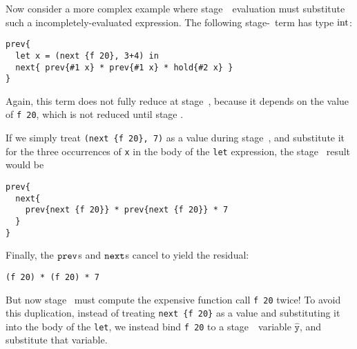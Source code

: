 Now consider a more complex example where stage~\bbone\ evaluation must
substitute such a incompletely-evaluated expression. The following
stage-\bbtwo\ term has type ${\rm int}$:
\begin{lstlisting} 
prev{
  let x = (next {f 20}, 3+4) in
  next{ prev{#1 x} * prev{#1 x} * hold{#2 x} }
}
\end{lstlisting}
Again, this term does not fully reduce at stage~\bbone, because it depends on
the value of \verb|f 20|, which is not reduced until stage \bbtwo.

If we simply treat \verb|(next {f 20}, 7)| as a value during stage~\bbone, and
substitute it for the three occurrences of \verb|x| in the body of the
\verb|let| expression, the stage \bbone\ result would be
\begin{lstlisting} 
prev{
  next{ 
    prev{next {f 20}} * prev{next {f 20}} * 7 
  }
}
\end{lstlisting}
Finally, the ${\tt prev}$s and ${\tt next}$s cancel to yield the residual:
\begin{lstlisting} 
(f 20) * (f 20) * 7
\end{lstlisting}
But now stage \bbtwo\ must compute the expensive function call \verb|f 20|
twice! To avoid this duplication, instead of treating \verb|next {f 20}| as a
value and substituting it into the body of the \verb|let|, we instead bind
\verb|f 20| to a stage~\bbtwo\ variable $\mathtt{\hat y}$, and substitute that
variable.

